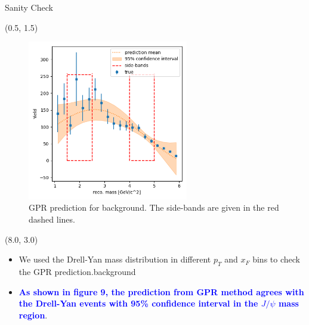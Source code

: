 \documentclass[10pt, xcolor={dvipsnames}, aspectratio = 169]{beamer}
\newcommand{\jpsi}{$J/\psi$ }
\begin{document}
\begin{frame}{Sanity Check}

\begin{textblock}{7.0}(0.5, 1.5)
\begin{figure}
    \centering
    \includegraphics[width=7.0cm]{imgs/mass_pt.png}
    \caption{GPR prediction for background. The side-bands are given in the red dashed lines.}
\end{figure}
\end{textblock}

\begin{textblock}{7.0}(8.0, 3.0)
\begin{itemize}

  \item We used the Drell-Yan mass distribution in different $p_{T}$ and $x_{F}$ bins to check the GPR prediction.background

  \item \textcolor{blue}{\textbf{As shown in figure 9, the prediction from GPR method agrees with the Drell-Yan events with 95\% confidence interval in the \jpsi mass region}}.

\end{itemize}
\end{textblock}

\end{frame}
\end{document}
